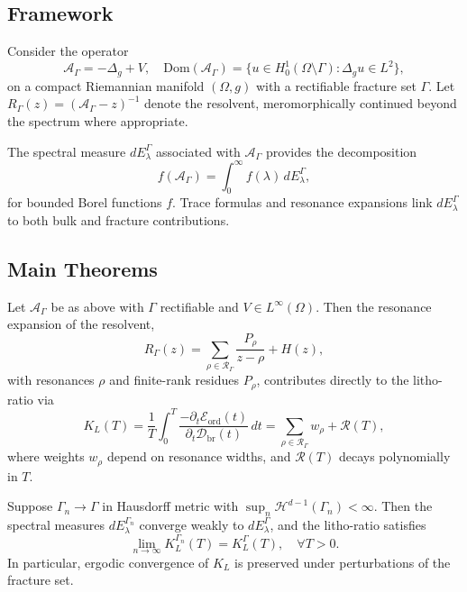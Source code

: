 \subsection*{Framework}
Consider the operator
\[
\mathcal{A}_\Gamma = -\Delta_g + V, 
\quad \mathrm{Dom}(\mathcal{A}_\Gamma) = \{ u \in H^1_0(\Omega \setminus \Gamma): \Delta_g u \in L^2 \},
\]
on a compact Riemannian manifold $(\Omega, g)$ with a rectifiable fracture set 
$\Gamma$. Let $R_\Gamma(z) = (\mathcal{A}_\Gamma - z)^{-1}$ denote the resolvent, 
meromorphically continued beyond the spectrum where appropriate.

The spectral measure $dE_\lambda^\Gamma$ associated with $\mathcal{A}_\Gamma$ 
provides the decomposition
\[
f(\mathcal{A}_\Gamma) = \int_0^\infty f(\lambda) \, dE_\lambda^\Gamma,
\]
for bounded Borel functions $f$. Trace formulas and resonance expansions link 
$dE_\lambda^\Gamma$ to both bulk and fracture contributions.

\subsection*{Main Theorems}

\begin{theorem}
\label{thm:resonance}
Let $\mathcal{A}_\Gamma$ be as above with $\Gamma$ rectifiable and $V \in L^\infty(\Omega)$. 
Then the resonance expansion of the resolvent,
\[
R_\Gamma(z) = \sum_{\rho \in \mathcal{R}_\Gamma} \frac{P_\rho}{z-\rho} + H(z),
\]
with resonances $\rho$ and finite-rank residues $P_\rho$, contributes directly 
to the litho-ratio via
\[
K_L(T) = \frac{1}{T}\int_0^T \frac{-\partial_t \mathcal{E}_{\mathrm{ord}}(t)}{\partial_t \mathcal{D}_{\mathrm{br}}(t)} \, dt
= \sum_{\rho \in \mathcal{R}_\Gamma} w_\rho + \mathcal{R}(T),
\]
where weights $w_\rho$ depend on resonance widths, and $\mathcal{R}(T)$ decays 
polynomially in $T$.
\end{theorem}

\begin{theorem}
\label{thm:stability}
Suppose $\Gamma_n \to \Gamma$ in Hausdorff metric with 
$\sup_n \mathcal{H}^{d-1}(\Gamma_n) < \infty$. Then the spectral measures 
$dE_\lambda^{\Gamma_n}$ converge weakly to $dE_\lambda^\Gamma$, and the 
litho-ratio satisfies
\[
\lim_{n\to\infty} K_L^{\Gamma_n}(T) = K_L^\Gamma(T), \quad \forall T>0.
\]
In particular, ergodic convergence of $K_L$ is preserved under perturbations 
of the fracture set.
\end{theorem}

